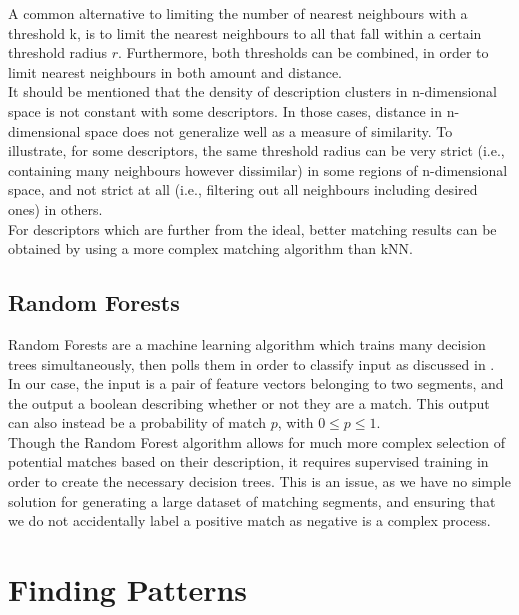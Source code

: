 A common alternative to limiting the number of nearest neighbours with a threshold k, is to limit the nearest neighbours to all that fall within a certain threshold radius $r$. Furthermore, both thresholds can be combined, in order to limit nearest neighbours in both amount and distance.\\

It should be mentioned that the density of description clusters in n-dimensional space is not constant with some descriptors. In those cases, distance in n-dimensional space does not generalize well as a measure of similarity. To illustrate, for some descriptors, the same threshold radius can be very strict (i.e., containing many neighbours however dissimilar) in some regions of n-dimensional space, and not strict at all (i.e., filtering out all neighbours including desired ones) in others.\\

For descriptors which are further from the ideal, better matching results can be obtained by using a more complex matching algorithm than kNN.

\subsection{Random Forests}
\label{subsec:RF}

Random Forests are a machine learning algorithm which trains many decision trees simultaneously, then polls them in order to classify input as discussed in \cite{breiman2001random}.\\

In our case, the input is a pair of feature vectors belonging to two segments, and the output a boolean describing whether or not they are a match. This output can also instead be a probability of match $p$, with $0 \leq p \leq 1$.\\

Though the Random Forest algorithm allows for much more complex selection of potential matches based on their description, it requires supervised training in order to create the necessary decision trees. This is an issue, as we have no simple solution for generating a large dataset of matching segments, and ensuring that we do not accidentally label a positive match as negative is a complex process.\\


\section{Finding Patterns}
\label{sec:filtering}

